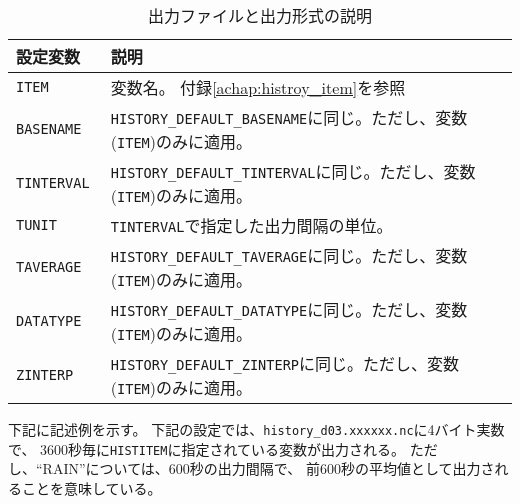 \begin{table}[htb]
\begin{center}
\caption{出力ファイルと出力形式の説明}
\begin{tabularx}{150mm}{|l|X|} \hline
 \rowcolor[gray]{0.9} 設定変数 & 説明 \\ \hline
 \verb|ITEM      | & 変数名。 付録\ref{achap:histroy_item}を参照\\ \hline
 \verb|BASENAME  | & \verb|HISTORY_DEFAULT_BASENAME|に同じ。ただし、変数(\verb|ITEM|)のみに適用。\\ \hline
 \verb|TINTERVAL | & \verb|HISTORY_DEFAULT_TINTERVAL|に同じ。ただし、変数(\verb|ITEM|)のみに適用。\\ \hline
 \verb|TUNIT     | & \verb|TINTERVAL|で指定した出力間隔の単位。\\ \hline
 \verb|TAVERAGE  | & \verb|HISTORY_DEFAULT_TAVERAGE|に同じ。ただし、変数(\verb|ITEM|)のみに適用。\\ \hline
 \verb|DATATYPE  | & \verb|HISTORY_DEFAULT_DATATYPE|に同じ。ただし、変数(\verb|ITEM|)のみに適用。\\ \hline
 \verb|ZINTERP   | & \verb|HISTORY_DEFAULT_ZINTERP|に同じ。ただし、変数(\verb|ITEM|)のみに適用。\\ \hline
\end{tabularx}
\label{tab:histitem}
\end{center}
\end{table}



下記に記述例を示す。
下記の設定では、\verb|history_d03.xxxxxx.nc|に4バイト実数で、
3600秒毎に\verb|HISTITEM|に指定されている変数が出力される。
ただし、``RAIN''については、600秒の出力間隔で、
前600秒の平均値として出力されることを意味している。\\

\\


